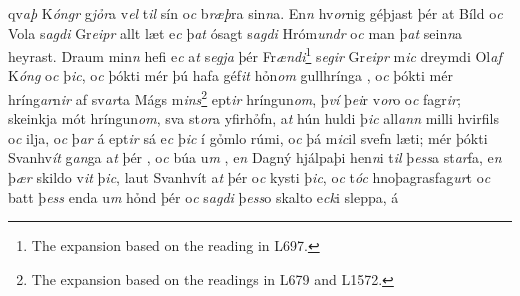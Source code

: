 qv\textit{aþ} K\textit{óngr} g\textit{jỏr}a v\textit{el} t\textit{il} sín o\textit{c}
b\textit{ræþ}ra sin\textit{n}a. En\textit{n} hv\textit{or}nig géþjast þér at
Bíld o\textit{c} Vola s\textit{agdi} Gr\textit{eipr} allt læt
e\textit{c} þ\textit{at} ósagt s\textit{agdi} Hróm\textit{undr} o\textit{c}
man  þ\textit{at} sein\textit{n}a heyrast. Draum min\textit{n} hefi
e\textit{c} a\textit{t} s\textit{egja} þér Fr\textit{ændi}\footnote{The expansion based on the reading in L697.}  s\textit{egir} Gr\textit{eipr} m\textit{ic} dreymdi Ol\textit{af} K\textit{óng}
o\textit{c} þ\textit{ic}, o\textit{c} þókti mér   þú hafa  géf\textit{it} hỏn\textit{om} gullhrínga  , o\textit{c} þókti mér   hríng\textit{ar}n\textit{ir}  af    sv\textit{ar}ta Mágs m\textit{ins}\footnote{The expansion based on the readings in L679 and L1572.}    ept\textit{ir} hríngun\textit{om}, þ\textit{ví}  þ\textit{ei}r v\textit{or}o   o\textit{c} fagr\textit{ir};  
  skeinkja   mót hríngun\textit{om}, sva st\textit{or}a yfirhỏfn, 
a\textit{t} hún huldi  þ\textit{ic} all\textit{an}\textit{n}  milli   hvirfils o\textit{c}  ilja,  o\textit{c}
þ\textit{ar} á ept\textit{ir} sá e\textit{c} þ\textit{ic} í gỏmlo rúmi,
o\textit{c}  þá m\textit{ic}il svefn  læti; mér þókti Svanhv\textit{ít}
g\textit{an}ga a\textit{t} þér  , o\textit{c} búa u\textit{m} ,  e\textit{n} Dagný hjálpaþi hen\textit{n}i t\textit{il}
þ\textit{ess}a st\textit{ar}fa, e\textit{n}  þ\textit{ær} skildo v\textit{it} þ\textit{ic},  laut Svanhvít
a\textit{t} þér o\textit{c} kysti þ\textit{ic}, o\textit{c} t\textit{óc} hnoþagrasfag\textit{ur}t o\textit{c} batt þ\textit{ess} enda u\textit{m} hỏnd þér
o\textit{c} s\textit{agdi} þ\textit{ess}o skalto e\textit{ck}i sleppa, á
